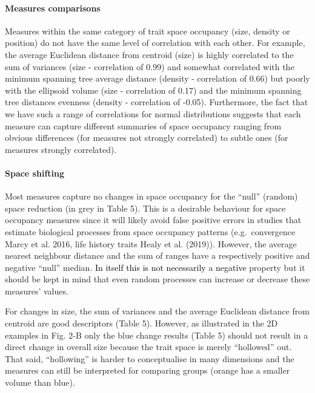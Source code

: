 \documentclass[]{article}
\let\oldparagraph\paragraph
\renewcommand{\paragraph}[1]{\oldparagraph{#1}\mbox{}}
\begin{document}
\paragraph{Measures comparisons}\label{measures-comparisons}

Measures within the same category of trait space occupancy (size,
density or position) do not have the same level of correlation with each
other. For example, the average Euclidean distance from centroid (size)
is highly correlated to the sum of variances (size - correlation of
0.99) and somewhat correlated with the minimum spanning tree average
distance (density - correlation of 0.66) but poorly with the ellipsoid
volume (size - correlation of 0.17) and the minimum spanning tree
distances evenness (density - correlation of -0.05). Furthermore, the
fact that we have such a range of correlations for normal distributions
suggests that each measure can capture different summaries of space
occupancy ranging from obvious differences (for measures not strongly
correlated) to subtle ones (for measures strongly correlated).

\paragraph{Space shifting}\label{space-shifting-1}

Most measures capture no changes in space occupancy for the ``null''
(random) space reduction (in grey in Table 5). This is a desirable
behaviour for space occupancy measures since it will likely avoid false
positive errors in studies that estimate biological processes from space
occupancy patterns (e.g.~convergence Marcy et al. 2016, life history
traits Healy et al. (2019)). However, the average nearest neighbour
distance and the sum of ranges have a respectively positive and negative
``null'' median. \textcolor{black}{In itself this is
not necessarily a negative} property but it should be kept in mind that
even random processes can increase or decrease these measures' values.

For changes in size, the sum of variances and the average Euclidean
distance from centroid are good descriptors (Table 5). However, as
illustrated in the 2D examples in Fig. 2-B only the blue change results
(Table 5) should not result in a direct change in overall size because
the trait space is merely ``hollowed'' out. That said, ``hollowing'' is
harder to conceptualise in many dimensions and the measures can still be
interpreted for comparing groups (orange has a smaller volume than
blue).
\end{document}
